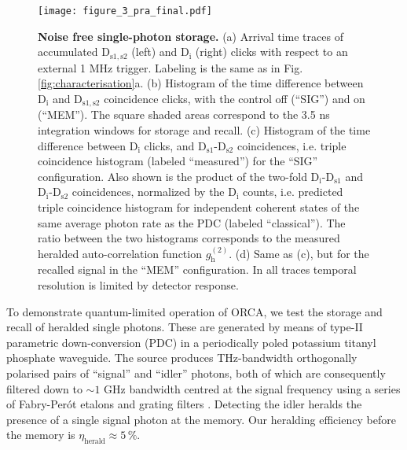 \documentclass[%
 reprint,
 amsmath,amssymb,
 aps,
 pra,
]{revtex4-1}
\begin{document}
\begin{figure}[h]
\centering
\texttt{[image: figure\_3\_pra\_final.pdf]} 
\caption{\textbf{Noise free single-photon storage.}
%
(a) Arrival time traces of accumulated D$_\mathrm{s1,s2}$ (left) and D$_\mathrm{i}$ (right) clicks with respect to an external 1 MHz trigger. Labeling is the same as in Fig. \ref{fig:characterisation}a.
%
(b) Histogram of the time difference between D$_\mathrm{i}$ and D$_\mathrm{s1,s2}$ coincidence clicks, with the control off (``SIG'') and on (``MEM''). The square shaded areas correspond to the 3.5 ns integration windows for storage and recall.
%
(c) Histogram of the time difference between D$_\mathrm{i}$ clicks, and D$_\mathrm{s1}$-D$_\mathrm{s2}$ coincidences, i.e. triple coincidence histogram (labeled ``measured'') for the ``SIG'' configuration. Also shown is the product of the two-fold D$_\mathrm{i}$-D$_\mathrm{s1}$ and D$_\mathrm{i}$-D$_\mathrm{s2}$ coincidences, normalized by the D$_\mathrm{i}$ counts, i.e. predicted triple coincidence histogram for independent coherent states of the same average photon rate as the PDC (labeled ``classical''). The ratio between the two histograms corresponds to the measured heralded auto-correlation function $g^{(2)}_\mathrm{h}$.
%
(d) Same as (c), but for the recalled signal in the ``MEM'' configuration. In all traces temporal resolution is limited by detector response.
}
\label{fig:quantum}
\end{figure}

To demonstrate quantum-limited operation of ORCA, we test the storage and recall of heralded single photons. These are generated by means of type-II parametric down-conversion (PDC) in a periodically poled potassium titanyl phosphate waveguide. The source produces THz-bandwidth orthogonally polarised pairs of ``signal'' and ``idler'' photons, both of which are consequently filtered down to $\sim1$ GHz bandwidth centred at the signal frequency using a series of Fabry-Per\'ot etalons and grating filters \cite{Michelberger2015}. Detecting the idler heralds the presence of a single signal photon at the memory. Our heralding efficiency before the memory is $\eta_\textrm{herald}\approx5\,\%$.
\end{document}
